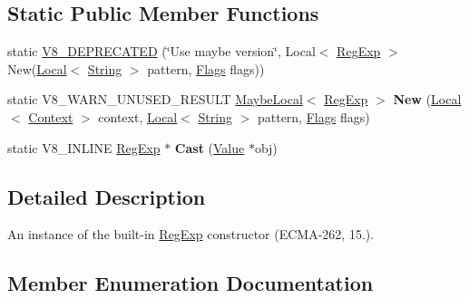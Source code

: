 \subsection*{Static Public Member Functions}
\begin{DoxyCompactItemize}
\item 
static \mbox{\hyperlink{classv8_1_1RegExp_a0ddd75d67bc7e6efbd6486f764ddd458}{V8\+\_\+\+D\+E\+P\+R\+E\+C\+A\+T\+ED}} (\char`\"{}Use maybe version\char`\"{}, Local$<$ \mbox{\hyperlink{classv8_1_1RegExp}{Reg\+Exp}} $>$ New(\mbox{\hyperlink{classv8_1_1Local}{Local}}$<$ \mbox{\hyperlink{classv8_1_1String}{String}} $>$ pattern, \mbox{\hyperlink{classv8_1_1RegExp_aa4718a5c1f18472aff3bf51ed694fc5a}{Flags}} flags))
\item 
\mbox{\label{classv8_1_1RegExp_a805f632fe98d58160773a4ba1e424b15}} 
static V8\+\_\+\+W\+A\+R\+N\+\_\+\+U\+N\+U\+S\+E\+D\+\_\+\+R\+E\+S\+U\+LT \mbox{\hyperlink{classv8_1_1MaybeLocal}{Maybe\+Local}}$<$ \mbox{\hyperlink{classv8_1_1RegExp}{Reg\+Exp}} $>$ {\bfseries New} (\mbox{\hyperlink{classv8_1_1Local}{Local}}$<$ \mbox{\hyperlink{classv8_1_1Context}{Context}} $>$ context, \mbox{\hyperlink{classv8_1_1Local}{Local}}$<$ \mbox{\hyperlink{classv8_1_1String}{String}} $>$ pattern, \mbox{\hyperlink{classv8_1_1RegExp_aa4718a5c1f18472aff3bf51ed694fc5a}{Flags}} flags)
\item 
\mbox{\label{classv8_1_1RegExp_ab3f85572312815cbdf5ee368d358c40f}} 
static V8\+\_\+\+I\+N\+L\+I\+NE \mbox{\hyperlink{classv8_1_1RegExp}{Reg\+Exp}} $\ast$ {\bfseries Cast} (\mbox{\hyperlink{classv8_1_1Value}{Value}} $\ast$obj)
\end{DoxyCompactItemize}


\subsection{Detailed Description}
An instance of the built-\/in \mbox{\hyperlink{classv8_1_1RegExp}{Reg\+Exp}} constructor (E\+C\+M\+A-\/262, 15.). 

\subsection{Member Enumeration Documentation}
\mbox{\label{classv8_1_1RegExp_aa4718a5c1f18472aff3bf51ed694fc5a}} 

